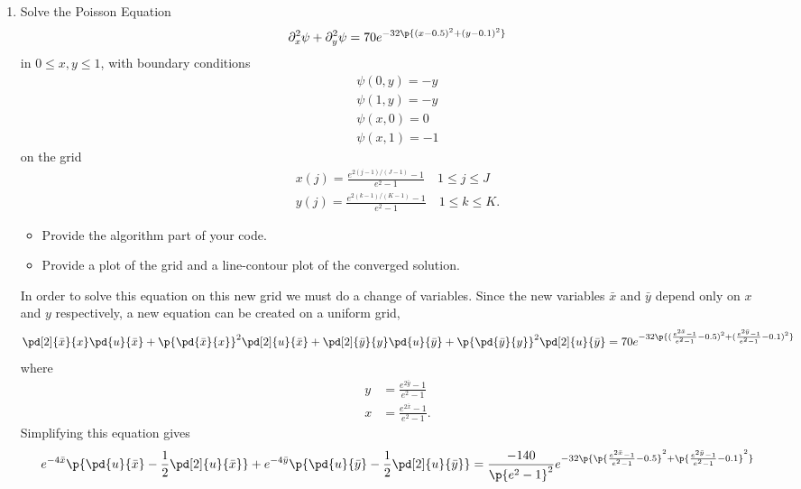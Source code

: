 \documentclass[11pt, oneside]{article}
\newcommand{\xb}{\bar{x}}
\newcommand{\yb}{\bar{y}}
\begin{document}
\begin{enumerate}
  \item %
    Solve the Poisson Equation
    \[
      \partial_x^2\psi + \partial^2_y\psi = 70e^{-32\p{(x - 0.5)^2 + (y - 0.1)^2}}
    \]
    in $0 \le x, y \le 1$, with boundary conditions
    \begin{gather*}
      \psi(0, y) = -y \\
      \psi(1, y) = -y \\
      \psi(x, 0) = 0 \\
      \psi(x, 1) = -1
    \end{gather*}
    on the grid
    \begin{gather*}
      x(j) = \frac{e^{2(j-1)/(J-1)} - 1}{e^2 - 1} \quad 1 \le j \le J \\
      y(j) = \frac{e^{2(k-1)/(K-1)} - 1}{e^2 - 1} \quad 1 \le k \le K.
    \end{gather*}
    \begin{itemize}
      \item Provide the algorithm part of your code.
      \item Provide a plot of the grid and a line-contour plot of the converged solution.
    \end{itemize}

    In order to solve this equation on this new grid we must do a change of
    variables.
    Since the new variables $\xb$ and $\yb$ depend only on $x$ and $y$
    respectively, a new equation can be created on a uniform grid,
    \[
      \pd[2]{\xb}{x} \pd{u}{\xb} + \p{\pd{\xb}{x}}^2 \pd[2]{u}{\xb}
      + \pd[2]{\yb}{y} \pd{u}{\yb} + \p{\pd{\yb}{y}}^2 \pd[2]{u}{\yb}
      = 70e^{-32\p{(\frac{e^{2\xb} - 1}{e^2 - 1} - 0.5)^2 + (\frac{e^{2\yb} - 1}{e^2 - 1} - 0.1)^2}}
    \]
    where
    \begin{align*}
      y &= \frac{e^{2\yb} - 1}{e^2 - 1} \\
      x &= \frac{e^{2\xb} - 1}{e^2 - 1}.
    \end{align*}
    Simplifying this equation gives
    \begin{align*}
      e^{-4\xb} \p{\pd{u}{\xb} - \frac{1}{2} \pd[2]{u}{\xb}} + e^{-4\yb} \p{\pd{u}{\yb} - \frac{1}{2} \pd[2]{u}{\yb}}
      = \frac{-140}{\p{e^2 - 1}^2} e^{-32\p{\p{\frac{e^{2\xb} - 1}{e^2 - 1} - 0.5}^2 + \p{\frac{e^{2\yb} - 1}{e^2 - 1} - 0.1}^2}}
    \end{align*}


\end{enumerate}
\end{document}
